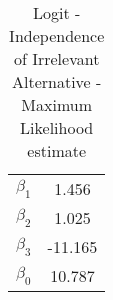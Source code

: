 \begin{table}[htb]
\centering
\caption{Logit - Independence of Irrelevant Alternative - Maximum Likelihood estimate}\label{tab:mvIIA}
\begin{tabular}{lc}
 \hline 
$\beta_1$ & 1.456 \\ 
$\beta_2$ & 1.025 \\ 
$\beta_3$ & -11.165 \\ 
$\beta_0$ & 10.787 \\ 
\hline
\end{tabular}
\end{table}

